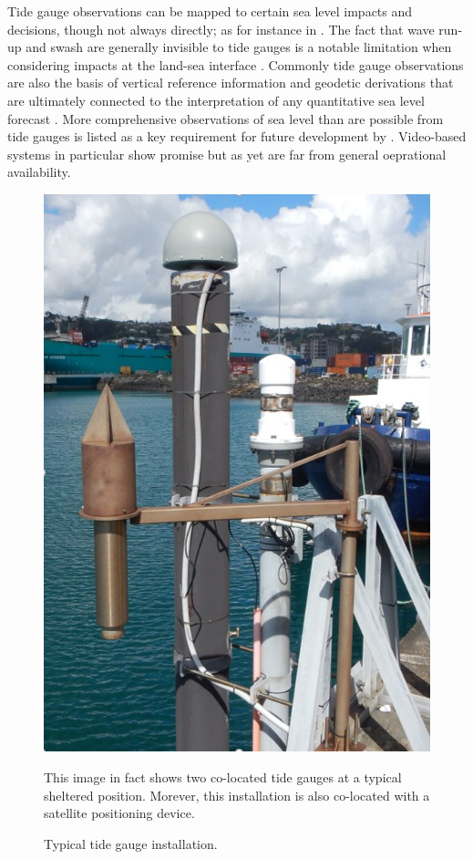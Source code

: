 Tide gauge observations can be mapped to certain sea level impacts and decisions, though not always directly; as for instance in \citep{Hague:2019ha}.    The fact that wave run-up and swash are generally invisible to tide gauges is a notable limitation when considering impacts at the land-sea interface \citep{Serafin:2017fl,10.1007/s11069-020-04178-3}.
Commonly tide gauge observations are also the basis of vertical reference information and geodetic derivations that are ultimately connected to the interpretation of any quantitative sea level forecast \citep{Woppelmann:2006un}\citep{AVWS2021}.
More comprehensive observations of sea level than are possible from tide gauges is listed as a key requirement for future development by \citeauthor{10.3389/fmars.2019.00437}.    Video-based systems in particular show promise \citep{10.1175/jtech-d-18-0203.1}\citep{2018agufmep52d..26h} but as yet are far from general oeprational availability. 
\begin{figure}[!hbt]\centering
  \includegraphics[width=\figwidthThird]{figures/images/tidegaugeEg.png}
  \caption{Typical tide gauge installation.}{This image in fact shows two co-located tide gauges at a typical sheltered position. Morever, this installation is also co-located with a satellite positioning device.}
  \label{fig:tidegauge}
\end{figure}

